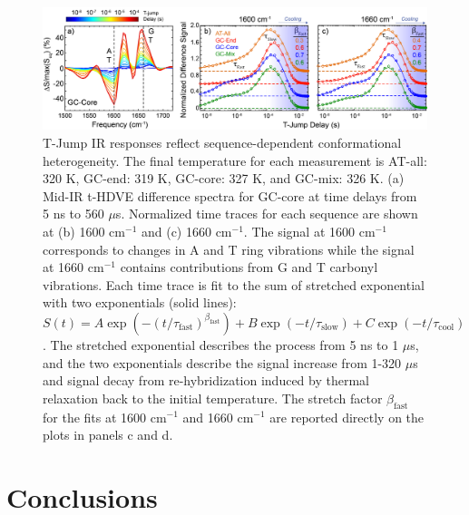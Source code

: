 \documentclass[journal=jpcbfk,manuscript=article]{achemso}
\newcommand*{\rood}[1]{{#1}}
\begin{document}
\begin{figure}[ht!]
	\begin{center} 
        \includegraphics[width=1.0\textwidth]{Fig5.pdf}
        \caption{T-Jump IR responses reflect sequence-dependent conformational heterogeneity. \rood{The final temperature for each measurement is AT-all: 320 K, GC-end: 319 K, GC-core: 327 K, and GC-mix: 326 K. (a) Mid-IR t-HDVE difference spectra for GC-core at time delays from 5 ns to 560 $\mu$s. Normalized time traces for each sequence are shown at (b) 1600 cm$^{-1}$ and (c) 1660 cm$^{-1}$.} The signal at 1600 cm$^{-1}$ corresponds to changes in A and T ring vibrations while the signal at 1660 cm$^{-1}$ contains contributions from G and T carbonyl vibrations. Each time trace is fit to the sum of stretched exponential with two exponentials (solid lines): $S(t) = A\exp{(-(t/\tau_{\mathrm{fast}})^{\beta_\mathrm{fast}})} + B\exp{(-t/\tau_{\mathrm{slow}})}+C\exp{(-t/\tau_{\mathrm{cool}})}$. The stretched exponential describes the process from 5 ns to 1 $\mu$s, and the two exponentials describe the signal increase from 1-320 $\mu$s and signal decay from re-hybridization induced by thermal relaxation back to the initial temperature. The stretch factor $\beta_\mathrm{fast}$ for the fits at 1600 cm$^{-1}$ and 1660 cm$^{-1}$ are reported directly on the plots in panels c and d.
        }
        \label{fig:T-jump_stretching}
	\end{center}
\end{figure}

   
 
   


\section{\label{sec:conc}Conclusions}
\end{document}
